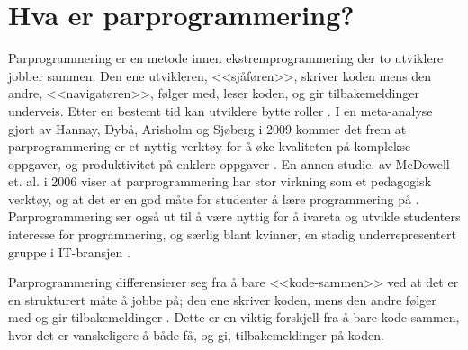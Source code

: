 \section{Hva er parprogrammering?}

% 

Parprogrammering er en metode innen ekstremprogrammering der to utviklere jobber sammen. Den ene utvikleren, <<sjåføren>>, skriver koden mens den andre, <<navigatøren>>, følger med, leser koden, og gir tilbakemeldinger underveis. Etter en bestemt tid kan utviklere bytte roller \cite{McDowell2006}. 
I en meta-analyse gjort av Hannay, Dybå, Arisholm og Sjøberg i 2009 kommer det frem at parprogrammering er et nyttig verktøy for å øke kvaliteten på komplekse oppgaver, og produktivitet på enklere oppgaver \cite{hannay2009}.
En annen studie, av McDowell et. al. i 2006 viser at parprogrammering har stor virkning som et pedagogisk verktøy, og at det er en god måte for studenter å lære programmering på \cite{McDowell2006}.
Parprogrammering ser også ut til å være nyttig for å ivareta og utvikle studenters interesse for programmering, og særlig blant kvinner, en stadig underrepresentert gruppe i IT-bransjen \cite{McDowell2006}\cite{kattan2018}.

Parprogrammering differensierer seg fra å bare <<kode-sammen>> ved at det er en strukturert måte å jobbe på; den ene skriver koden, mens den andre følger med og gir tilbakemeldinger \cite{kattan2018}. 
Dette er en viktig forskjell fra å bare kode sammen, hvor det er vanskeligere å både få, og gi, tilbakemeldinger på koden.
